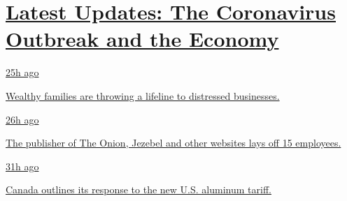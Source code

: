 \hypertarget{latest-updates-the-coronavirus-outbreak-and-the-economy}{%
\section{\texorpdfstring{\href{https://www.nytimes.com/live/2020/08/07/business/stock-market-today-coronavirus?action=click\&pgtype=Article\&state=default\&region=MAIN_CONTENT_1\&context=storylines_live_updates}{Latest
Updates: The Coronavirus Outbreak and the
Economy}}{Latest Updates: The Coronavirus Outbreak and the Economy}}\label{latest-updates-the-coronavirus-outbreak-and-the-economy}}

\href{https://www.nytimes.com/live/2020/08/07/business/stock-market-today-coronavirus?action=click\&pgtype=Article\&state=default\&region=MAIN_CONTENT_1\&context=storylines_live_updates\#wealthy-families-are-throwing-a-lifeline-to-distressed-businesses}{25h
ago}

\href{https://www.nytimes.com/live/2020/08/07/business/stock-market-today-coronavirus?action=click\&pgtype=Article\&state=default\&region=MAIN_CONTENT_1\&context=storylines_live_updates\#wealthy-families-are-throwing-a-lifeline-to-distressed-businesses}{Wealthy
families are throwing a lifeline to distressed businesses.}

\href{https://www.nytimes.com/live/2020/08/07/business/stock-market-today-coronavirus?action=click\&pgtype=Article\&state=default\&region=MAIN_CONTENT_1\&context=storylines_live_updates\#the-publisher-of-the-onion-jezebel-and-other-websites-lays-off-15-employees}{26h
ago}

\href{https://www.nytimes.com/live/2020/08/07/business/stock-market-today-coronavirus?action=click\&pgtype=Article\&state=default\&region=MAIN_CONTENT_1\&context=storylines_live_updates\#the-publisher-of-the-onion-jezebel-and-other-websites-lays-off-15-employees}{The
publisher of The Onion, Jezebel and other websites lays off 15
employees.}

\href{https://www.nytimes.com/live/2020/08/07/business/stock-market-today-coronavirus?action=click\&pgtype=Article\&state=default\&region=MAIN_CONTENT_1\&context=storylines_live_updates\#canada-outlines-its-response-to-the-new-us-aluminum-tariff}{31h
ago}

\href{https://www.nytimes.com/live/2020/08/07/business/stock-market-today-coronavirus?action=click\&pgtype=Article\&state=default\&region=MAIN_CONTENT_1\&context=storylines_live_updates\#canada-outlines-its-response-to-the-new-us-aluminum-tariff}{Canada
outlines its response to the new U.S. aluminum tariff.}

